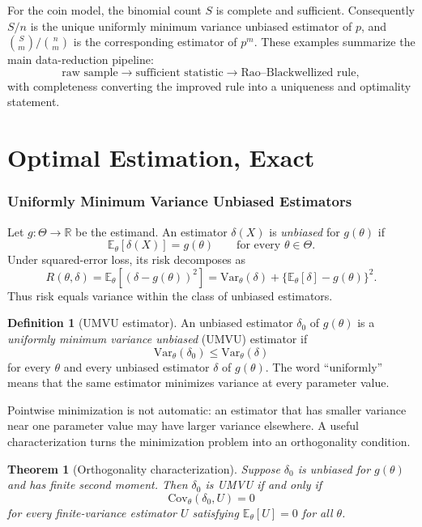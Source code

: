 \documentclass[12pt,oneside]{book}
\numberwithin{equation}{section}
\theoremstyle{definition}
\newtheorem{definition}{Definition}[section]
\theoremstyle{plain}
\newtheorem{theorem}{Theorem}[section]
\theoremstyle{remark}
\newcommand{\R}{\mathbb{R}}
\newcommand{\E}{\mathbb{E}}
\newcommand{\Var}{\mathrm{Var}}
\newcommand{\Cov}{\mathrm{Cov}}
\begin{document}
For the coin model, the binomial count $S$ is complete and sufficient.
Consequently $S/n$ is the unique uniformly minimum variance unbiased
estimator of $p$, and
$\binom{S}{m}/\binom{n}{m}$ is the corresponding estimator of $p^m$.  These
examples summarize the main data-reduction pipeline:
\[
    \text{raw sample}
    \longrightarrow \text{sufficient statistic}
    \longrightarrow \text{Rao--Blackwellized rule},
\]
with completeness converting the improved rule into a uniqueness and
optimality statement.

\part{Optimal Estimation, Exact}

\section{Uniformly Minimum Variance Unbiased Estimators}

Let $g:\Theta\to\R$ be the estimand.  An estimator $\delta(X)$ is
\emph{unbiased} for $g(\theta)$ if
\[
    \E_\theta[\delta(X)]=g(\theta)
    \qquad\text{for every }\theta\in\Theta.
\]
Under squared-error loss, its risk decomposes as
\begin{equation}
    R(\theta,\delta)
    =\E_\theta[(\delta-g(\theta))^2]
    =\Var_\theta(\delta)
      +\{\E_\theta[\delta]-g(\theta)\}^2.
    \label{eq:bias-variance-decomposition}
\end{equation}
Thus risk equals variance within the class of unbiased estimators.

\begin{definition}[UMVU estimator]
An unbiased estimator $\delta_0$ of $g(\theta)$ is a \emph{uniformly minimum
variance unbiased} (UMVU) estimator if
\[
    \Var_\theta(\delta_0)
    \leq \Var_\theta(\delta)
\]
for every $\theta$ and every unbiased estimator $\delta$ of $g(\theta)$.
The word ``uniformly'' means that the same estimator minimizes variance at
every parameter value.
\end{definition}

Pointwise minimization is not automatic: an estimator that has smaller
variance near one parameter value may have larger variance elsewhere.  A
useful characterization turns the minimization problem into an orthogonality
condition.

\begin{theorem}[Orthogonality characterization]
Suppose $\delta_0$ is unbiased for $g(\theta)$ and has finite second moment.
Then $\delta_0$ is UMVU if and only if
\begin{equation}
    \Cov_\theta(\delta_0,U)=0
    \label{eq:umvu-orthogonality}
\end{equation}
for every finite-variance estimator $U$ satisfying
$\E_\theta[U]=0$ for all $\theta$.
\end{theorem}
\end{document}
